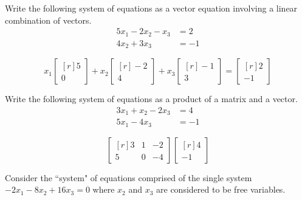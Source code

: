 \documentclass[11pt,noanswers]{exam} %
\renewcommand{\vec}[1]{\mathbf{#1}}
\newcommand{\mat}[1]{\begin{bmatrix*}[r] #1 \end{bmatrix*}}
\begin{document}
\begin{questions}
    \question Write the following system of equations as a vector equation involving a linear combination of vectors.
    \begin{align*}
        5x_1 - 2x_2 - x_3 &= 2 \\
        4x_2 + 3x_3 &= -1
    \end{align*}
    \begin{solution}
        \begin{equation*}
            x_1 \mat{5 \\ 0} + x_2 \mat{-2 \\ 4} + x_3 \mat{-1 \\ 3} = \mat{2 \\ -1}
        \end{equation*}
    \end{solution}
    
    \question Write the following system of equations as a product of a matrix and a vector.
    \begin{align*}
        3x_1 + x_2  - 2x_3 &= 4 \\
        5x_1 - 4x_3 &= -1
    \end{align*}
    \begin{solution}
        \[ \mat{3 & 1 & -2 \\ 5 & 0 & -4} \mat{4 \\ -1} \]
    \end{solution}

    \question Consider the ``system" of equations comprised of the single system $-2x_1 - 8 x_2 + 16x_3 = 0$ where $x_2$ and $x_3$ are considered to be free variables.
    \begin{solution}
\end{solution}
\end{questions}
\end{document}
